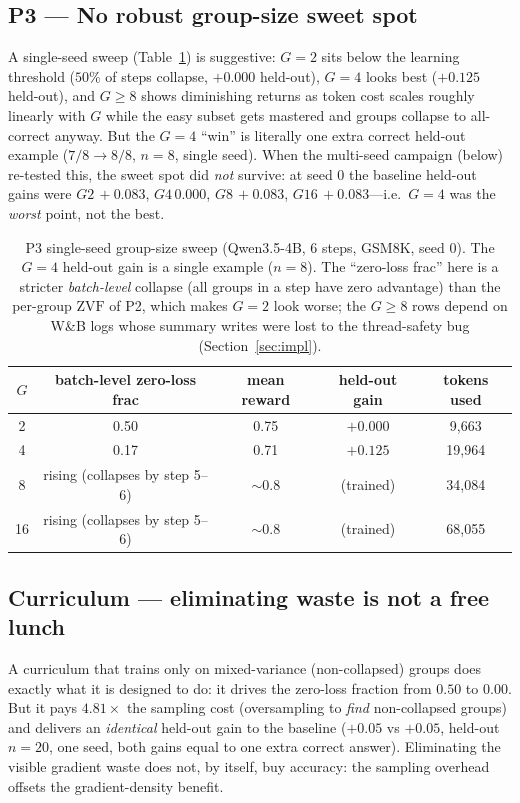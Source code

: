 \documentclass[12pt,a4paper]{report}
\newcommand{\zvf}{\mathrm{ZVF}}
\begin{document}
\subsection{P3 --- No robust group-size sweet spot}

A single-seed sweep (Table~\ref{tab:p3}) is suggestive: $G{=}2$ sits below the
learning threshold ($50\%$ of steps collapse, $+0.000$ held-out), $G{=}4$ looks
best ($+0.125$ held-out), and $G\ge8$ shows diminishing returns as token cost
scales roughly linearly with $G$ while the easy subset gets mastered and groups
collapse to all-correct anyway. But the $G{=}4$ ``win'' is literally one extra
correct held-out example ($7/8 \to 8/8$, $n=8$, single seed). When the multi-seed
campaign (below) re-tested this, the sweet spot did \emph{not} survive: at seed 0
the baseline held-out gains were $G2\,{+}0.083$, $G4\,{0.000}$, $G8\,{+}0.083$,
$G16\,{+}0.083$---i.e.\ $G{=}4$ was the \emph{worst} point, not the best.

\begin{table}[t]
\centering
\small
\begin{tabular}{@{}ccccc@{}}
\toprule
$G$ & batch-level zero-loss frac & mean reward & held-out gain & tokens used \\
\midrule
2  & 0.50 & 0.75 & $+0.000$ & 9{,}663 \\
4  & 0.17 & 0.71 & $+0.125$ & 19{,}964 \\
8  & rising (collapses by step 5--6) & ${\sim}0.8$ & (trained) & 34{,}084 \\
16 & rising (collapses by step 5--6) & ${\sim}0.8$ & (trained) & 68{,}055 \\
\bottomrule
\end{tabular}
\caption{P3 single-seed group-size sweep (Qwen3.5-4B, 6 steps, GSM8K, seed 0).
The $G{=}4$ held-out gain is a single example ($n=8$). The ``zero-loss frac''
here is a stricter \emph{batch-level} collapse (all groups in a step have zero
advantage) than the per-group $\zvf$ of P2, which makes $G{=}2$ look worse; the
$G\ge8$ rows depend on W\&B logs whose summary writes were lost to the
thread-safety bug (Section~\ref{sec:impl}).}
\label{tab:p3}
\end{table}

\subsection{Curriculum --- eliminating waste is not a free lunch}
A curriculum that trains only on mixed-variance (non-collapsed) groups does
exactly what it is designed to do: it drives the zero-loss fraction from $0.50$
to $0.00$. But it pays $4.81\times$ the sampling cost (oversampling to \emph{find}
non-collapsed groups) and delivers an \emph{identical} held-out gain to the
baseline ($+0.05$ vs $+0.05$, held-out $n=20$, one seed, both gains equal to one
extra correct answer). Eliminating the visible gradient waste does not, by
itself, buy accuracy: the sampling overhead offsets the gradient-density benefit.
\end{document}
